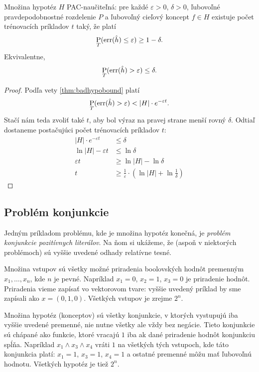 \begin{corollary}
  Množina hypotéz $H$ PAC-naučiteľná: pre každé $\varepsilon > 0$,
  $\delta > 0$, ľubovoľné pravdepodobnostné rozdelenie $P$ a ľubovoľný
  cieľový koncept $f \in H$ existuje počet trénovacích príkladov $t$
  taký, že platí
  $$\operatorname*{\mathrm{P}}_T(\mathrm{err}(\hat{h}) \leq \varepsilon) \geq 1 - \delta.$$
  Ekvivalentne,
  $$\operatorname*{\mathrm{P}}_T(\mathrm{err}(\hat{h}) > \varepsilon) \leq \delta.$$
\end{corollary}
\begin{proof}
  Podľa vety \ref{thm:badhypobound} platí
  $$\operatorname*{\mathrm{P}}_T(\mathrm{err}(\hat{h}) > \varepsilon) < |H| \cdot e^{-\varepsilon t}.$$
  Stačí nám teda zvoliť také $t$, aby bol výraz na pravej strane menší
  rovný $\delta$. Odtiaľ dostaneme postačujúci počet trénovacích
  príkladov $t$:
  \begin{align}
    |H| \cdot e^{-\varepsilon t} &\leq \delta \\
    \ln{|H|} - \varepsilon t &\leq \ln{\delta} \\
    \varepsilon t &\geq \ln{|H|} - \ln{\delta} \\
    t &\geq \frac{1}{\varepsilon} \cdot \left( \ln{|H|} + \ln{\frac{1}{\delta}} \right)
  \end{align}
\end{proof}



\subsection{Problém konjunkcie}

Jedným príkladom problému, kde je množina hypotéz konečná, je
\emph{problém konjunkcie pozitívnych literálov}. Na ňom si ukážeme,
že (aspoň v niektorých problémoch) sú vyššie uvedené odhady relatívne
tesné.

Množina vstupov sú všetky možné priradenia boolovských hodnôt premenným
$x_1, \ldots, x_n$, kde $n$ je pevné. Napríklad $x_1 = 0$, $x_2 = 1$,
$x_3 = 0$ je priradenie hodnôt. Priradenia vieme zapísať vo vektorovom
tvare: vyššie uvedený príklad by sme zapísali ako $x = (0, 1, 0)$.
Všetkých vstupov je zrejme $2^n$.

Množina hypotéz (konceptov) sú všetky konjunkcie, v ktorých vystupujú
iba vyššie uvedené premenné, nie nutne všetky ale vždy bez negácie.
Tieto konjunkcie sú chápané ako funkcie, ktoré vracajú $1$ iba ak dané
priradenie hodnôt konjunkciu spĺňa. Napríklad $x_1 \land x_3 \land x_4$
vráti $1$ na všetkých tých vstupoch, kde táto konjunkcia platí:
$x_1 = 1$, $x_3 = 1$, $x_4 = 1$ a ostatné premenné môžu mať ľubovoľnú
hodnotu. Všetkých hypotéz je tiež $2^n$.


